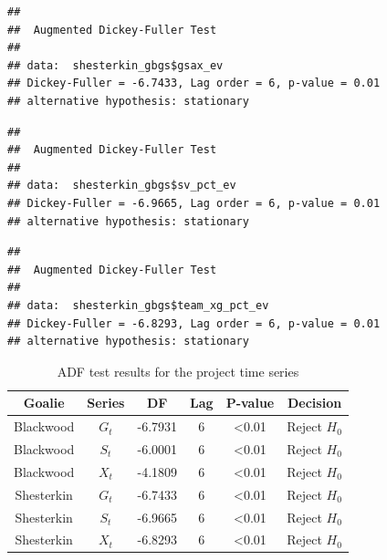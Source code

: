 \documentclass[
  10pt,
]{extarticle}
\newenvironment{Shaded}{\begin{snugshade}}{\end{snugshade}}
\newcommand{\FunctionTok}[1]{\textcolor[rgb]{0.13,0.29,0.53}{\textbf{#1}}}
\newcommand{\NormalTok}[1]{#1}
\newcommand{\SpecialCharTok}[1]{\textcolor[rgb]{0.81,0.36,0.00}{\textbf{#1}}}
\begin{document}
\begin{verbatim}
## 
##  Augmented Dickey-Fuller Test
## 
## data:  shesterkin_gbgs$gsax_ev
## Dickey-Fuller = -6.7433, Lag order = 6, p-value = 0.01
## alternative hypothesis: stationary
\end{verbatim}

\begin{Shaded}
\end{Shaded}

\begin{verbatim}
## 
##  Augmented Dickey-Fuller Test
## 
## data:  shesterkin_gbgs$sv_pct_ev
## Dickey-Fuller = -6.9665, Lag order = 6, p-value = 0.01
## alternative hypothesis: stationary
\end{verbatim}

\begin{Shaded}
\end{Shaded}

\begin{verbatim}
## 
##  Augmented Dickey-Fuller Test
## 
## data:  shesterkin_gbgs$team_xg_pct_ev
## Dickey-Fuller = -6.8293, Lag order = 6, p-value = 0.01
## alternative hypothesis: stationary
\end{verbatim}

\begin{center}
\scriptsize
\begin{table}[H]

\caption{\label{tab:p1-adf-table}ADF test results for the project time series}
\centering
\begin{tabular}[t]{cccccc}
\toprule
Goalie & Series & DF & Lag & P-value & Decision\\
\midrule
Blackwood & $G_t$ & -6.7931 & 6 & <0.01 & Reject $H_0$\\
Blackwood & $S_t$ & -6.0001 & 6 & <0.01 & Reject $H_0$\\
Blackwood & $X_t$ & -4.1809 & 6 & <0.01 & Reject $H_0$\\
Shesterkin & $G_t$ & -6.7433 & 6 & <0.01 & Reject $H_0$\\
Shesterkin & $S_t$ & -6.9665 & 6 & <0.01 & Reject $H_0$\\
\addlinespace
Shesterkin & $X_t$ & -6.8293 & 6 & <0.01 & Reject $H_0$\\
\bottomrule
\end{tabular}
\end{table}
\normalsize
\end{center}
\end{document}
